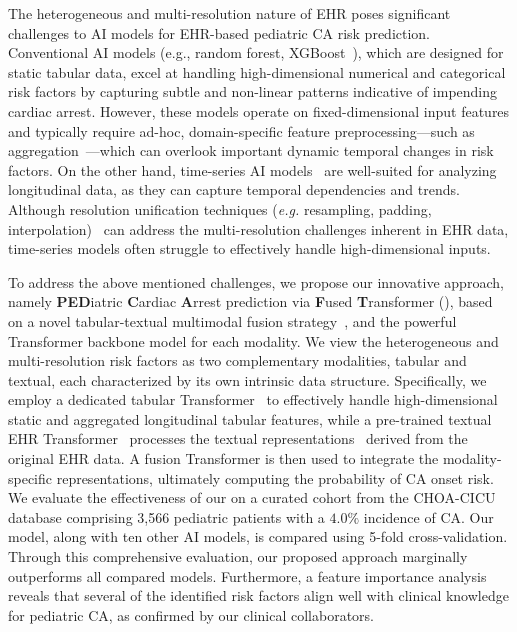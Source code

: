 The heterogeneous and multi-resolution nature of EHR poses significant challenges to AI models for EHR-based pediatric CA risk prediction. 
Conventional AI models (e.g., random forest, XGBoost~\cite{chen2016xgboost}), which are designed for static tabular data, excel at handling high-dimensional numerical and categorical risk factors by capturing subtle and non-linear patterns indicative of impending cardiac arrest. However, these models operate on fixed-dimensional input features and typically require ad-hoc, domain-specific feature preprocessing—such as aggregation~\cite{rajkomar2018countbase}—which can overlook important dynamic temporal changes in risk factors. 
On the other hand, time-series AI models~\cite{goswami2024momentfamilyopentimeseries} are well-suited for analyzing longitudinal data, as they can capture temporal dependencies and trends. Although resolution unification techniques (\textit{e.g.} resampling, padding, interpolation)~\cite{rasul2023lag,ekambaram2024tiny} can address the multi-resolution challenges inherent in EHR data, time-series models often struggle to effectively handle high-dimensional inputs.

To address the above mentioned challenges, we propose our innovative approach, namely \textbf{PED}iatric \textbf{C}ardiac \textbf{A}rrest prediction via \textbf{F}used \textbf{T}ransformer (\modelname), based on a novel tabular-textual multimodal fusion strategy~\cite{shi2021multimodal,lu2023mug}, and the powerful Transformer backbone model for each modality.
We view the heterogeneous and multi-resolution risk factors as two complementary modalities, tabular and textual, each characterized by its own intrinsic data structure. Specifically, we employ a dedicated tabular Transformer~\cite{huang2020tabtransformer,gorishniy2021FT-Trans} to effectively handle high-dimensional static and aggregated longitudinal tabular features, while a pre-trained textual EHR Transformer~\cite{yang2022gatortron} processes the textual representations~\cite{contreras2024dellirium} derived from the original EHR data. A fusion Transformer is then used to integrate the modality-specific representations, ultimately computing the probability of CA onset risk.
We evaluate the effectiveness of our \modelname on a curated cohort from the CHOA-CICU database comprising 3,566 pediatric patients with a $4.0\%$ incidence of CA. Our model, along with ten other AI models, is compared using 5-fold cross-validation. Through this comprehensive evaluation, our proposed approach marginally outperforms all compared models. Furthermore, a feature importance analysis reveals that several of the identified risk factors align well with clinical knowledge for pediatric CA, as confirmed by our clinical collaborators.


